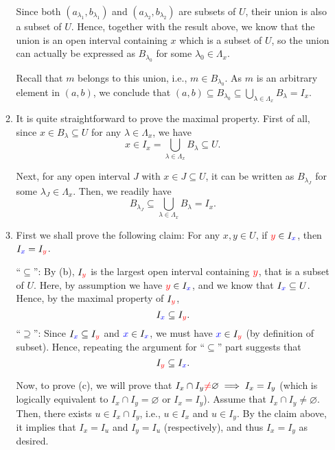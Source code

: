 \begin{enumerate}
\begin{pf}
\begin{enumerate}
Since both \((a_{\lambda_1},b_{\lambda_1})\) and
\((a_{\lambda_2},b_{\lambda_2})\) are subsets of \(U\), their union is also a
subset of \(U\). Hence, together with the result above, we know that the union
is an open interval containing \(x\) which is a subset of \(U\), so the union
can actually be expressed as \(B_{\lambda_0}\) for some
\(\lambda_0\in\Lambda_x\).

Recall that \(m\) belongs to this union, i.e., \(m\in B_{\lambda_0}\).
As \(m\) is an arbitrary element in \((a,b)\), we conclude that \(\displaystyle
(a,b)\subseteq B_{\lambda_0}\subseteq
\bigcup_{\lambda\in\Lambda_x}B_{\lambda}=I_x\).

\item It is quite straightforward to prove the maximal property. First of all,
since \(x\in B_{\lambda}\subseteq U\) for any \(\lambda\in\Lambda_{x}\), we have
\[
x\in I_x=\bigcup_{\lambda\in\Lambda_{x}}B_{\lambda}\subseteq U.
\]

Next, for any open interval \(J\) with \(x\in J\subseteq U\), it can be written
as \(B_{\lambda_J}\) for some \(\lambda_J\in\Lambda_x\). Then, we readily have
\[
B_{\lambda_{J}}\subseteq \bigcup_{\lambda\in\Lambda_x}B_{\lambda}=I_x.
\]

\item First we shall prove the following claim: For any \(x,y\in U\), if
\({\color{red}y}\in I_{\color{blue}x}\), then \(I_{\color{blue}x}=I_{{\color{red}y}}\).

\begin{pf}
``\(\subseteq\)'': By (b), \(I_{\color{red}y}\) is the largest open interval containing
\({\color{red}y}\), that is a subset of \(U\). Here, by assumption we have \({\color{red}y}\in
I_{\color{blue}x}\), and we know that \(I_{\color{blue}x}\subseteq U\). Hence, by the maximal property of
\(I_{\color{red}y}\),
\[
I_{\color{blue}x}\subseteq I_{\color{red}y}.
\]
``\(\supseteq\)'': Since \(I_{\color{blue}x}\subseteq I_{\color{red}y}\) and \({\color{blue}x}\in
I_{\color{blue}x}\), we must have \({\color{blue}x}\in I_{\color{red}y}\) (by definition of subset).
Hence, repeating the argument for ``\(\subseteq\)'' part suggests that
\[I_{\color{red}y}\subseteq I_{\color{blue}x}.\]
\end{pf}

Now, to prove (c), we will prove that \(I_x\cap I_y{\color{red}\ne}\varnothing\implies
I_x=I_y\) (which is logically equivalent to \(I_x\cap I_y=\varnothing\) or
\(I_x=I_y\)). Assume that \(I_x\cap I_y\ne\varnothing\). Then, there exists
\(u\in I_x\cap I_y\), i.e., \(u\in I_x\) and \(u\in I_y\). By the claim above,
it implies that \(I_x=I_u\) and \(I_y=I_u\) (respectively), and thus
\(I_x=I_y\) as desired.
\end{enumerate}
\end{pf}


\end{enumerate}
